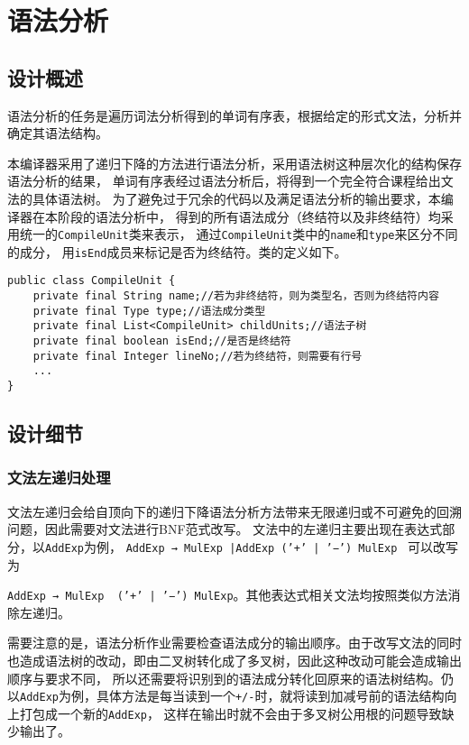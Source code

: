 \chapter{语法分析}
\section{设计概述}
语法分析的任务是遍历词法分析得到的单词有序表，根据给定的形式文法，分析并确定其语法结构。

本编译器采用了递归下降的方法进行语法分析，采用语法树这种层次化的结构保存语法分析的结果，
单词有序表经过语法分析后，将得到一个完全符合课程给出文法的具体语法树。
为了避免过于冗余的代码以及满足语法分析的输出要求，本编译器在本阶段的语法分析中，
得到的所有语法成分（终结符以及非终结符）均采用统一的\texttt{CompileUnit}类来表示，
通过\texttt{CompileUnit}类中的\texttt{name}和\texttt{type}来区分不同的成分，
用\texttt{isEnd}成员来标记是否为终结符。类的定义如下。
\begin{verbatim}
public class CompileUnit {
    private final String name;//若为非终结符，则为类型名，否则为终结符内容
    private final Type type;//语法成分类型
    private final List<CompileUnit> childUnits;//语法子树
    private final boolean isEnd;//是否是终结符
    private final Integer lineNo;//若为终结符，则需要有行号
    ...
}
\end{verbatim}

\section{设计细节}

\subsection{文法左递归处理}
文法左递归会给自顶向下的递归下降语法分析方法带来无限递归或不可避免的回溯问题，因此需要对文法进行BNF范式改写。
文法中的左递归主要出现在表达式部分，以\texttt{AddExp}为例，\newline
\texttt{AddExp →  MulExp |AddExp ('+' | '−') MulExp } 可以改写为

\texttt{AddExp →  MulExp { ('+' | '−') MulExp}}。其他表达式相关文法均按照类似方法消除左递归。

需要注意的是，语法分析作业需要检查语法成分的输出顺序。由于改写文法的同时也造成语法树的改动，即由二叉树转化成了多叉树，因此这种改动可能会造成输出顺序与要求不同，
所以还需要将识别到的语法成分转化回原来的语法树结构。仍以\texttt{AddExp}为例，具体方法是每当读到一个\texttt{+/-}时，就将读到加减号前的语法结构向上打包成一个新的\texttt{AddExp}，
这样在输出时就不会由于多叉树公用根的问题导致缺少输出了。

